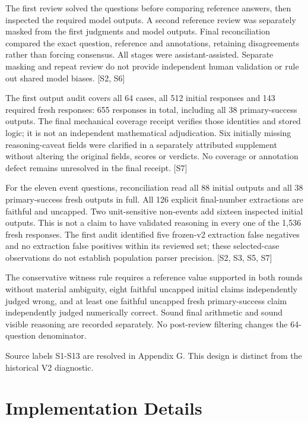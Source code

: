 \documentclass[12pt,a4paper]{report}
\begin{document}
The first review solved the questions before comparing reference
answers, then inspected the required model outputs. A second reference
review was separately masked from the first judgments and model outputs.
Final reconciliation compared the exact question, reference and
annotations, retaining disagreements rather than forcing consensus. All
stages were assistant-assisted. Separate masking and repeat review do
not provide independent human validation or rule out shared model
biases. {[}S2, S6{]}

The first output audit covers all 64 cases, all 512 initial responses
and 143 required fresh responses: 655 responses in total, including all
38 primary-success outputs. The final mechanical coverage receipt
verifies those identities and stored logic; it is not an independent
mathematical adjudication. Six initially missing reasoning-caveat fields
were clarified in a separately attributed supplement without altering
the original fields, scores or verdicts. No coverage or annotation
defect remains unresolved in the final receipt. {[}S7{]}

For the eleven event questions, reconciliation read all 88 initial
outputs and all 38 primary-success fresh outputs in full. All 126
explicit final-number extractions are faithful and uncapped. Two
unit-sensitive non-events add sixteen inspected initial outputs. This is
not a claim to have validated reasoning in every one of the 1,536 fresh
responses. The first audit identified five frozen-v2 extraction false
negatives and no extraction false positives within its reviewed set;
these selected-case observations do not establish population parser
precision. {[}S2, S3, S5, S7{]}

The conservative witness rule requires a reference value supported in
both rounds without material ambiguity, eight faithful uncapped initial
claims independently judged wrong, and at least one faithful uncapped
fresh primary-success claim independently judged numerically correct.
Sound final arithmetic and sound visible reasoning are recorded
separately. No post-review filtering changes the 64-question
denominator.

Source labels S1-S13 are resolved in Appendix G. This design is distinct
from the historical V2 diagnostic.



\chapter{Implementation Details}\label{implementation-details}
\end{document}
